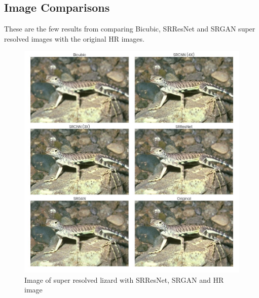 \subsection{Image Comparisons}
    These are the few results from comparing Bicubic, SRResNet and SRGAN super resolved images with the original HR images.
    \begin{figure}[ht]
        \centering
        \includegraphics[width=5.5in]{./figures/examples/lizard.jpg}
        \caption{Image of super resolved lizard with SRResNet, SRGAN and HR image}
    \end{figure}
    \newpage
